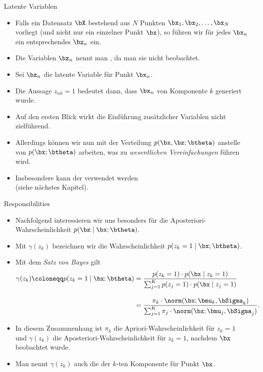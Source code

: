 \begin{frame}{Latente Variablen}{}
	\begin{itemize}
		\item Falls ein Datensatz $\bX$ bestehend aus $N$ Punkten $\bx_1, \bx_2, \ldots, \bx_N$ vorliegt (und nicht nur ein einzelner Punkt $\bx$),
			so führen wir für jedes $\bx_n$ ein entsprechendes $\bz_n$ ein.
		\item Die Variablen $\bz_n$ nennt man , da man sie nicht beobachtet.
		\item Sei $\bz_n$ die latente Variable für Punkt $\bx_n$.
		\item Die Aussage $z_{nk} = 1$ bedeutet dann, dass $\bx_n$ von Komponente $k$ generiert wurde.
		\item Auf den ersten Blick wirkt die Einführung zusätzlicher Variablen nicht zielführend.
		\item Allerdings können wir nun mit der Verteilung $p(\bx, \bz; \btheta)$ anstelle von $p(\bx; \btheta)$ arbeiten,
			was zu \textit{wesentlichen Vereinfachungen} führen wird.
		\item Insbesondere kann der  verwendet werden \\
			(siehe nächstes Kapitel).
	\end{itemize}
\end{frame}


\begin{frame}{Responsibilities}{}
	\begin{itemize}
		\item Nachfolgend interessieren wir uns besonders für die Aposteriori-Wahrscheinlichkeit $p(\bz \mid \bx; \btheta)$.
		\item Mit $\gamma(z_k)$ bezeichnen wir die Wahrscheinlichkeit $p(z_k = 1 \mid \bx; \btheta)$.
		\item Mit dem \textit{Satz von Bayes} gilt
		\begin{equation} \label{eq:gmm-responsibilities}
			\begin{aligned}
				\gamma(z_k) \coloneqq p(z_k = 1 \mid \bx; \btheta)
					&= \frac{p(z_k = 1) \cdot p(\bx \mid z_k = 1)}{\sum_{j=1}^K p(z_j = 1) \cdot p(\bx \mid z_j = 1)}
			\\[3mm]
					&= \frac{\pi_k \cdot \norm(\bx; \bmu_k, \bSigma_k)}{\sum_{j=1}^K \pi_j \cdot \norm(\bx; \bmu_j, \bSigma_j)}.
			\end{aligned}
		\end{equation}
		\item In diesem Zusammenhang ist $\pi_k$ die Apriori-Wahrscheinlichkeit für $z_k = 1$ und
			$\gamma(z_k)$ die Aposteriori-Wahrscheinlichkeit für $z_k = 1$, nachdem $\bx$ beobachtet wurde.
		\item Man nennt $\gamma(z_k)$ auch die  der $k$-ten Komponente für Punkt $\bx$. 
	\end{itemize}
\end{frame}


